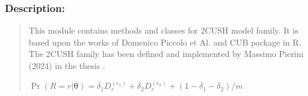 \documentclass[letterpaper,10pt,english]{sphinxmanual}
\begin{document}
\subsubsection{Description:}
\label{\detokenize{cubmods:id157}}\begin{quote}

\sphinxAtStartPar
This module contains methods and classes
for 2\sphinxhyphen{}CUSH model family.
It is based upon the works of Domenico
Piccolo et Al. and CUB package in R.
The 2\sphinxhyphen{}CUSH family has been defined and implemented
by Massimo Pierini (2024) in the thesis
.

\sphinxAtStartPar
\(\Pr(R=r|\pmb \theta) = \delta_1 D_r^{(c_1)} + \delta_2 D_r^{(c_2)} + (1 - \delta_1 - \delta_2)/m\)
\end{quote}
\end{document}
